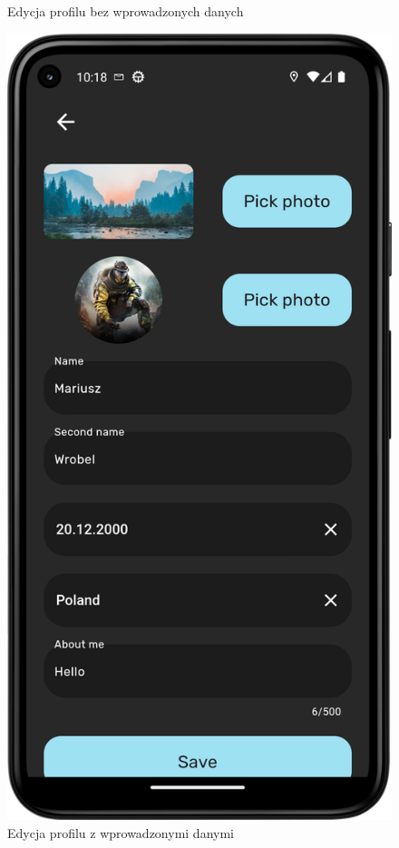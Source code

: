 \documentclass[a4paper,twoside,12pt]{book}
\begin{document}
\begin{figure}[H]
\begin{minipage}[b]{0.49\textwidth}
    \caption{Edycja profilu bez wprowadzonych danych}
  \end{minipage}
  \hfill
  \begin{minipage}[b]{0.49\textwidth}
    \includegraphics[width=\textwidth]{mobile_ss/edycja_profilu_z_danymi.png}
    \caption{Edycja profilu z wprowadzonymi danymi}
  \end{minipage}
\end{figure}
\end{document}
